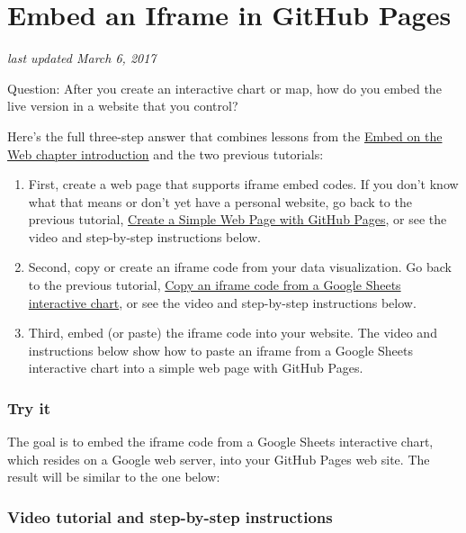 \documentclass[
  english,
]{book}
\begin{document}
\hypertarget{iframe-github}{%
\section{Embed an Iframe in GitHub Pages}\label{iframe-github}}

\emph{last updated March 6, 2017}

Question: After you create an interactive chart or map, how do you embed the live version in a website that you control?

Here's the full three-step answer that combines lessons from the \href{embed}{Embed on the Web chapter introduction} and the two previous tutorials:

\begin{enumerate}
\def\labelenumi{\arabic{enumi})}
\item
  First, create a web page that supports iframe embed codes. If you don't know what that means or don't yet have a personal website, go back to the previous tutorial, \href{github-pages}{Create a Simple Web Page with GitHub Pages}, or see the video and step-by-step instructions below.
\item
  Second, copy or create an iframe code from your data visualization. Go back to the previous tutorial, \href{iframe-google-sheets}{Copy an iframe code from a Google Sheets interactive chart}, or see the video and step-by-step instructions below.
\item
  Third, embed (or paste) the iframe code into your website. The video and instructions below show how to paste an iframe from a Google Sheets interactive chart into a simple web page with GitHub Pages.
\end{enumerate}

\hypertarget{try-it-4}{%
\subsubsection*{Try it}\label{try-it-4}}

The goal is to embed the iframe code from a Google Sheets interactive chart, which resides on a Google web server, into your GitHub Pages web site. The result will be similar to the one below:

\hypertarget{video-tutorial-and-step-by-step-instructions}{%
\subsubsection*{Video tutorial and step-by-step instructions}\label{video-tutorial-and-step-by-step-instructions}}
\end{document}
